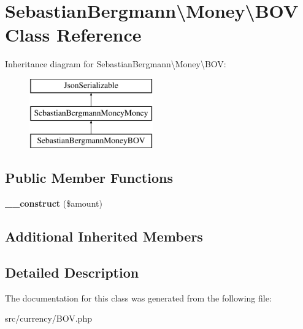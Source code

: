 \hypertarget{classSebastianBergmann_1_1Money_1_1BOV}{}\section{Sebastian\+Bergmann\textbackslash{}Money\textbackslash{}B\+O\+V Class Reference}
\label{classSebastianBergmann_1_1Money_1_1BOV}
Inheritance diagram for Sebastian\+Bergmann\textbackslash{}Money\textbackslash{}B\+O\+V\+:\begin{figure}[H]
\begin{center}
\leavevmode
\includegraphics[height=3.000000cm]{classSebastianBergmann_1_1Money_1_1BOV}
\end{center}
\end{figure}
\subsection*{Public Member Functions}
\begin{DoxyCompactItemize}
\item 
\hypertarget{classSebastianBergmann_1_1Money_1_1BOV_af4b8a11d6218eefbd38f286c785c4872}{}{\bfseries \+\_\+\+\_\+construct} (\$amount)\label{classSebastianBergmann_1_1Money_1_1BOV_af4b8a11d6218eefbd38f286c785c4872}

\end{DoxyCompactItemize}
\subsection*{Additional Inherited Members}


\subsection{Detailed Description}


The documentation for this class was generated from the following file\+:\begin{DoxyCompactItemize}
\item 
src/currency/B\+O\+V.\+php\end{DoxyCompactItemize}
